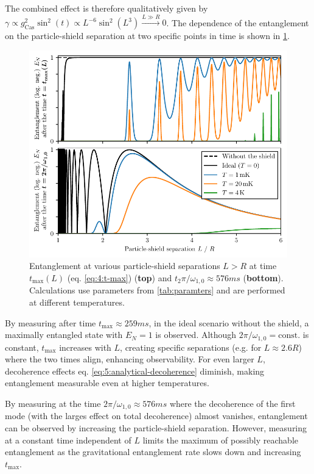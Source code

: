 The combined effect is therefore qualitatively given by $\gamma \propto g_\mathrm{Cas}^2 \sin^2(t) \propto L^{-6} \sin^2(L^3) \xrightarrow{L \gg R} 0$.
The dependence of the entanglement on the particle-shield separation at two specific points in time is shown in \cref{fig:5:entanglement-thermal-shield-L}.
\begin{figure}[!htbp]
  \centering
  \includegraphics[width=\textwidth]{./../figures/vibrations/all-modes-entanglement-L.pdf}
  \caption{Entanglement at various particle-shield separations $L > R$ at time $t_\mathrm{max}(L)$ (eq. \eqref{eq:4:t-max}) (\textbf{top}) and $t_2\pi/\omega_{1,0}\approx 576\si{ms}$ (\textbf{bottom}). Calculations use parameters from \cref{tab:paramters} and are performed at different temperatures.}
  \label{fig:5:entanglement-thermal-shield-L}
\end{figure}

By measuring after time $t_\mathrm{max} \approx 259\si{ms}$, in the ideal scenario without the shield, a maximally entangled state with $E_N = 1$ is observed.
Although $2\pi/\omega_{1,0} = \mathrm{const.}$ is constant, $t_\mathrm{max}$ increases with $L$, creating specific separations (e.g. for $L\approx 2.6R$) where the two times align, enhancing observability.
For even larger $L$, decoherence effects eq. \eqref{eq:5:analytical-decoherence} diminish, making entanglement measurable even at higher temperatures.

By measuring at the time $2\pi/\omega_{1,0} \approx 576\si{ms}$ where the decoherence of the first mode (with the larges effect on total decoherence) almost vanishes, entanglement can be observed by increasing the particle-shield separation.
However, measuring at a constant time independent of $L$ limits the maximum of possibly reachable entanglement as the gravitational entanglement rate slows down and increasing $t_\mathrm{max}$.

